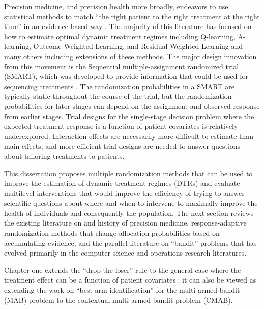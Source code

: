 \documentclass[12pt,,letterpaper,twoside]{report}
\begin{document}
Precision medicine, and precision health more broadly, endeavors to use
statistical methods to match ``the right patient to the right treatment
at the right time'' in an evidence-based way
\citep{kosorok2015adaptive, kosorok2019precision}. The majority of this
literature has focused on how to estimate optimal dynamic treatment
regimes including Q-learning, A-learning, Outcome Weighted Learning, and
Residual Weighted Learning and many others including extensions of these
methods. The major design innovation from this movement is the
Sequential multiple-assignment randomized trial (SMART), which was
developed to provide information that could be used for sequencing
treatments \citep{lei2012smart}. The randomization probabilities in a
SMART are typically static throughout the course of the trial, but the
randomization probabilities for later stages can depend on the
assignment and observed response from earlier stages. Trial designs for
the single-stage decision problem where the expected treatment response
is a function of patient covariates is relatively underexplored.
Interaction effects are necessarily more difficult to estimate than main
effects, and more efficient trial designs are needed to answer questions
about tailoring treatments to patients.

This dissertation proposes multiple randomization methods that can be
used to improve the estimation of dynamic treatment regimes (DTRs) and
evaluate multilevel interventions that would improve the efficiency of
trying to answer scientific questions about where and when to intervene
to maximally improve the health of individuals and consequently the
population. The next section reviews the existing literature on and
history of precision medicine, response-adaptive randomization methods
that change allocation probabilities based on accumulating evidence, and
the parallel literature on ``bandit'' problems that has evolved
primarily in the computer science and operations research literatures.

Chapter one extends the ``drop the loser'' rule to the general case
where the treatment effect can be a function of patient covariates
\citep{ivanova2000drop, ivanova2003play}; it can also be viewed as
extending the work on ``best arm identification'' for the multi-armed
bandit (MAB) problem to the contextual multi-armed bandit problem
(CMAB).
\end{document}
